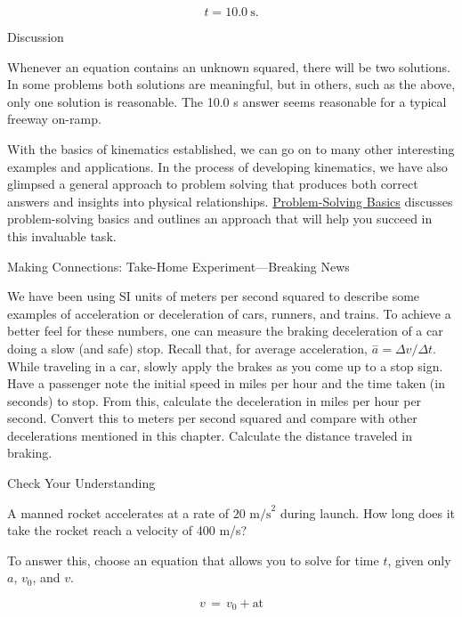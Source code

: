 \documentclass[
]{book}
\begin{document}
\leavevmode{}%
\[{{{t = \text{10}}\text{.}0\ \text{s}}.}{}\]

{Discussion}

Whenever an equation contains an unknown squared, there will be two
solutions. In some problems both solutions are meaningful, but in
others, such as the above, only one solution is reasonable. The 10.0 s
answer seems reasonable for a typical freeway on-ramp.

With the basics of kinematics established, we can go on to many other
interesting examples and applications. In the process of developing
kinematics, we have also glimpsed a general approach to problem solving
that produces both correct answers and insights into physical
relationships. \href{/m54774}{Problem-Solving Basics} discusses
problem-solving basics and outlines an approach that will help you
succeed in this invaluable task.

\hypertarget{fs-id1164906508057}{}
Making Connections: Take-Home Experiment---Breaking News

We have been using SI units of meters per second squared to describe
some examples of acceleration or deceleration of cars, runners, and
trains. To achieve a better feel for these numbers, one can measure the
braking deceleration of a car doing a slow (and safe) stop. Recall that,
for average acceleration, \({\overset{-}{a} = {\Delta v/\Delta t}}{}\).
While traveling in a car, slowly apply the brakes as you come up to a
stop sign. Have a passenger note the initial speed in miles per hour and
the time taken (in seconds) to stop. From this, calculate the
deceleration in miles per hour per second. Convert this to meters per
second squared and compare with other decelerations mentioned in this
chapter. Calculate the distance traveled in braking.

\hypertarget{fs-id1164906434690}{}
Check Your Understanding

\leavevmode{}%
A manned rocket accelerates at a rate of \(\text{20\ m/s}^{2}{}\) during
launch. How long does it take the rocket reach a velocity of 400 m/s?

\leavevmode{}%
To answer this, choose an equation that allows you to solve for time
\emph{\(t{}\)}, given only \(a{}\), \(v_{0}{}\), and \(v{}\).

\leavevmode{}%
\[{v\, = \, v_{0} + \text{at}}{}\]
\end{document}
